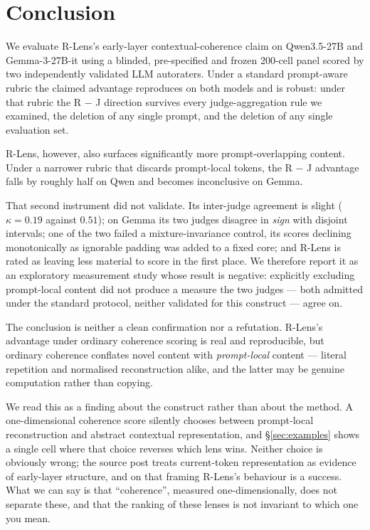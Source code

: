 \documentclass[11pt]{article}
\newcommand{\flag}[1]{\textcolor{flagged}{#1}}
\begin{document}
\section{Conclusion}

We evaluate R-Lens's early-layer contextual-coherence claim on Qwen3.5-27B and
Gemma-3-27B-it using a blinded, pre-specified and frozen 200-cell panel scored by
two independently validated LLM autoraters. Under a standard prompt-aware rubric
the claimed advantage reproduces on both models and is robust: under that rubric
the R $-$ J direction survives every judge-aggregation rule we examined, the
deletion of any single prompt, and the deletion of any single evaluation set.

R-Lens, however, also surfaces significantly more prompt-overlapping content.
Under a narrower rubric that discards prompt-local tokens, the R $-$ J advantage
falls by roughly half on Qwen and becomes inconclusive on Gemma.

That second instrument did not validate. Its inter-judge agreement is slight
($\kappa = 0.19$ against $0.51$); on Gemma its two judges disagree in \emph{sign}
with disjoint intervals; one of the two failed a mixture-invariance control,
its scores declining monotonically as ignorable padding was added to a fixed
core; and R-Lens is rated as leaving less material to score in the first place.
We therefore report it as an exploratory measurement study whose result is
negative: \flag{explicitly excluding prompt-local content did not produce a
measure the two judges --- both admitted under the standard protocol, neither
validated for this construct --- agree on.}

The conclusion is neither a clean confirmation nor a refutation. R-Lens's
advantage under ordinary coherence scoring is real and reproducible, but ordinary
coherence conflates novel content with \emph{prompt-local} content --- literal
repetition and normalised reconstruction alike, and the latter may be genuine
computation rather than copying.

We read this as a finding about the construct rather than about the method. A
one-dimensional coherence score silently chooses between prompt-local
reconstruction and abstract contextual representation, and \S\ref{sec:examples}
shows a single cell where that choice reverses which lens wins. Neither choice is
obviously wrong; the source post treats current-token representation as evidence
of early-layer structure, and on that framing R-Lens's behaviour is a success.
What we can say is that ``coherence'', measured one-dimensionally, does not
separate these, and that the ranking of these lenses is not invariant to which
one you mean.
\end{document}
